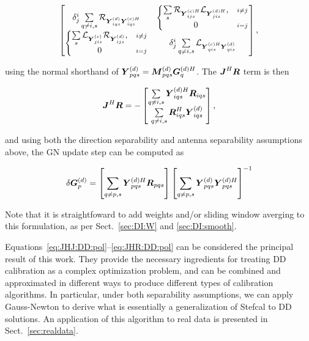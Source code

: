 \documentclass[useAMS,usenatbib]{mn2e}
\newcommand{\mat}[1]{{\bmath{#1}}}
\newcommand{\JJ}{\mat{J}} %
\newcommand{\RR}{\mat{R}}
\begin{document}
\begin{equation}
\label{eq:JHJ:DD:pol}
\Matrix{cc}{
  \delta^i_j \sum\limits_{q\ne i,s} \Rop{\YYd_{iqs} \YYcH_{iqs}} & 
  \left \{ 
  \begin{array}{@{}cc@{}}
   \sum\limits_{s} \Rop{ \YYcH_{ijs}  } \Lop{\YYdH_{jis}},&{\scriptstyle i\ne j} \\
   0 &{\scriptstyle i=j}
  \end{array} \right . 
  \\
  \left \{ 
  \begin{array}{@{}cc@{}}
   \sum\limits_{s} \Lop{ \YYc_{jis}  } \Rop{\YYd_{ijs}},&{\scriptstyle i\ne j} \\
   0 &{\scriptstyle i=j}
  \end{array} \right . 
  &
  \delta^i_j \sum\limits_{q\ne i,s} \Lop{\YYcH_{qis}\YYd_{qis}}
},
\end{equation}

using the normal shorthand of $\YYd_{pqs} = \MMd_{pqs} \GGdH_q$. The $\JJ^H\bmath{R}$ term is then

\newcommand{\CCC}{\mathcal{C}}

\begin{equation}
\label{eq:JHR:DD:pol}
\JJ^H\bmath{R} = -\Matrix{c}{
\sum\limits_{q\ne i,s} \YYdH_{iqs} \RR_{iqs} \\
\sum\limits_{q\ne i,s} \RR^H_{iqs} \YYd_{iqs}  } 
,
\end{equation}

and using both the direction separability and antenna separability assumptions above, the GN update step can be computed as

\begin{equation}
\label{eq:update:DD:diag:pol}
\delta \GGd_p = \left [ \sum\limits_{q\ne p,s} \YYdH_{pqs} \RR_{pqs} \right ] 
\left [ \sum\limits_{q\ne p,s} \YYd_{pqs} \YYdH_{pqs}  \right ]^{-1}
\end{equation}

Note that it is straightfoward to add weights and/or sliding window averging to this formulation, as per 
Sect.~\ref{sec:DI:W} and \ref{sec:DI:smooth}.

Equations~\ref{eq:JHJ:DD:pol}--\ref{eq:JHR:DD:pol} can be considered the principal result of this work.
They provide the necessary ingredients for treating DD calibration as a complex optimization 
problem, and can be combined and approximated in different ways to produce different types of calibration 
algorithms. In particular, under both separability assumptions, we can apply Gauss-Newton to derive what is essentially a generalization of 
Stefcal to DD solutions. An application of this algorithm to real data is presented in Sect.~\ref{sec:realdata}.
\end{document}
